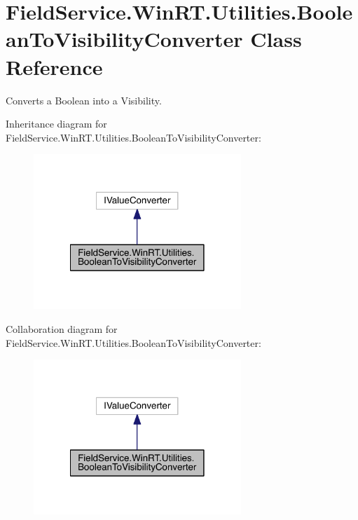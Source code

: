 \hypertarget{class_field_service_1_1_win_r_t_1_1_utilities_1_1_boolean_to_visibility_converter}{\section{Field\+Service.\+Win\+R\+T.\+Utilities.\+Boolean\+To\+Visibility\+Converter Class Reference}
\label{class_field_service_1_1_win_r_t_1_1_utilities_1_1_boolean_to_visibility_converter}
}


Converts a Boolean into a Visibility.  




Inheritance diagram for Field\+Service.\+Win\+R\+T.\+Utilities.\+Boolean\+To\+Visibility\+Converter\+:
\nopagebreak
\begin{figure}[H]
\begin{center}
\leavevmode
\includegraphics[width=222pt]{class_field_service_1_1_win_r_t_1_1_utilities_1_1_boolean_to_visibility_converter__inherit__graph}
\end{center}
\end{figure}


Collaboration diagram for Field\+Service.\+Win\+R\+T.\+Utilities.\+Boolean\+To\+Visibility\+Converter\+:
\nopagebreak
\begin{figure}[H]
\begin{center}
\leavevmode
\includegraphics[width=222pt]{class_field_service_1_1_win_r_t_1_1_utilities_1_1_boolean_to_visibility_converter__coll__graph}
\end{center}
\end{figure}
